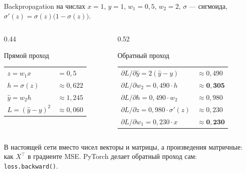 \begin{frame}[c]{Backpropagation на числах}
  \small $x = 1$, $y = 1$, $w_1 = 0{,}5$, $w_2 = 2$, $\sigma$ --- сигмоида, $\sigma'(z) = \sigma(z)\bigl(1 - \sigma(z)\bigr)$.

  \medskip
  \begin{columns}[T]
    \begin{column}{0.44\textwidth}
      \begin{block}{Прямой проход}
        \small
        \begin{tabular}{@{}ll@{}}
          $z = w_1 x$ & $= 0{,}5$\\
          $h = \sigma(z)$ & $\approx 0{,}622$\\
          $\hat y = w_2 h$ & $\approx 1{,}245$\\
          $L = (\hat y - y)^2$ & $\approx 0{,}060$\\
        \end{tabular}
      \end{block}
    \end{column}
    \begin{column}{0.52\textwidth}
      \begin{block}{Обратный проход}
        \small
        \begin{tabular}{@{}ll@{}}
          $\partial L/\partial \hat y = 2(\hat y - y)$ & $\approx 0{,}490$\\
          $\partial L/\partial w_2 = 0{,}490\cdot h$ & $\approx \mathbf{0{,}305}$\\
          $\partial L/\partial h = 0{,}490\cdot w_2$ & $\approx 0{,}980$\\
          $\partial L/\partial z = 0{,}980\cdot\sigma'(z)$ & $\approx 0{,}230$\\
          $\partial L/\partial w_1 = 0{,}230\cdot x$ & $\approx \mathbf{0{,}230}$\\
        \end{tabular}
      \end{block}
    \end{column}
  \end{columns}

  \medskip
  {\footnotesize\color{acGray}В настоящей сети вместо чисел векторы и матрицы, а произведения матричные:
  как $X^\top$ в градиенте MSE. PyTorch делает обратный проход сам: \texttt{loss.backward()}.\par}
\end{frame}
